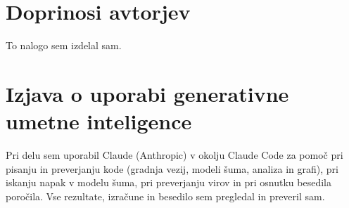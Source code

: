 \section*{Doprinosi avtorjev}

To nalogo sem izdelal sam.

\section*{Izjava o uporabi generativne umetne inteligence}

Pri delu sem uporabil Claude (Anthropic) v okolju Claude Code za pomoč pri pisanju in preverjanju kode (gradnja vezij, modeli šuma, analiza in grafi), pri iskanju napak v modelu šuma, pri preverjanju virov in pri osnutku besedila poročila. Vse rezultate, izračune in besedilo sem pregledal in preveril sam.
